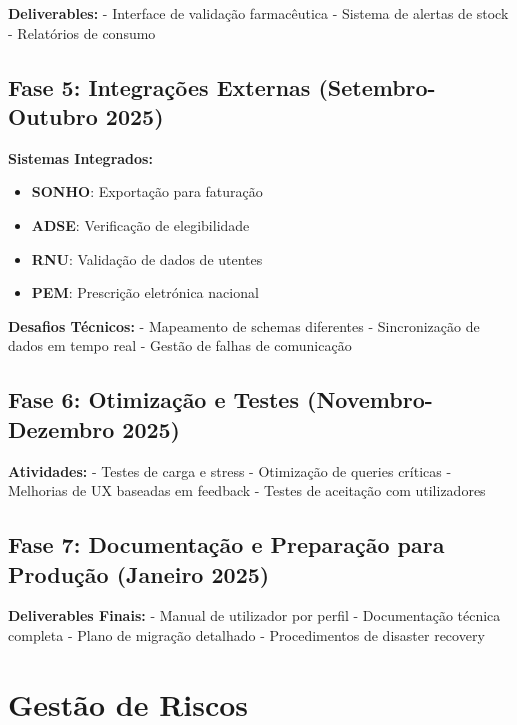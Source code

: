 \textbf{Deliverables:}
- Interface de validação farmacêutica
- Sistema de alertas de stock
- Relatórios de consumo


\subsection{Fase 5: Integrações Externas (Setembro-Outubro 2025)}

\textbf{Sistemas Integrados:}
\begin{itemize}
    \item \textbf{SONHO}: Exportação para faturação
    \item \textbf{ADSE}: Verificação de elegibilidade
    \item \textbf{RNU}: Validação de dados de utentes
    \item \textbf{PEM}: Prescrição eletrónica nacional
\end{itemize}

\textbf{Desafios Técnicos:}
- Mapeamento de schemas diferentes
- Sincronização de dados em tempo real
- Gestão de falhas de comunicação

\subsection{Fase 6: Otimização e Testes (Novembro-Dezembro 2025)}

\textbf{Atividades:}
- Testes de carga e stress
- Otimização de queries críticas
- Melhorias de UX baseadas em feedback
- Testes de aceitação com utilizadores


\subsection{Fase 7: Documentação e Preparação para Produção (Janeiro 2025)}

\textbf{Deliverables Finais:}
- Manual de utilizador por perfil
- Documentação técnica completa
- Plano de migração detalhado
- Procedimentos de disaster recovery

\section{Gestão de Riscos}


